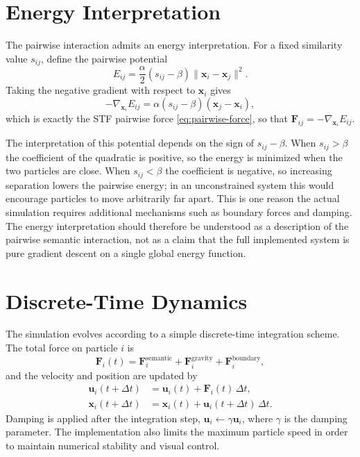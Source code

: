 \documentclass[11pt]{amsart}
\begin{document}
\section{Energy Interpretation}

The pairwise interaction admits an energy interpretation. For a fixed
similarity value $s_{ij}$, define the pairwise potential
\begin{equation}
\label{eq:pairwise-energy}
E_{ij}
=
\frac{\alpha}{2} \left( s_{ij} - \beta \right)
\|\mathbf{x}_i - \mathbf{x}_j\|^2.
\end{equation}
Taking the negative gradient with respect to $\mathbf{x}_i$ gives
\[
-\nabla_{\mathbf{x}_i} E_{ij}
=
\alpha \left( s_{ij} - \beta \right) (\mathbf{x}_j - \mathbf{x}_i),
\]
which is exactly the STF pairwise force \eqref{eq:pairwise-force}, so that
$\mathbf{F}_{ij} = -\nabla_{\mathbf{x}_i} E_{ij}$.

The interpretation of this potential depends on the sign of $s_{ij} - \beta$.
When $s_{ij} > \beta$ the coefficient of the quadratic is positive, so the
energy is minimized when the two particles are close. When $s_{ij} < \beta$ the
coefficient is negative, so increasing separation lowers the pairwise energy;
in an unconstrained system this would encourage particles to move arbitrarily
far apart. This is one reason the actual simulation requires additional
mechanisms such as boundary forces and damping. The energy interpretation
should therefore be understood as a description of the pairwise semantic
interaction, not as a claim that the full implemented system is pure gradient
descent on a single global energy function.

\section{Discrete-Time Dynamics}

The simulation evolves according to a simple discrete-time integration scheme.
The total force on particle $i$ is
\begin{equation}
\label{eq:total-force}
\mathbf{F}_i(t)
=
\mathbf{F}_i^{\mathrm{semantic}}
+ \mathbf{F}_i^{\mathrm{gravity}}
+ \mathbf{F}_i^{\mathrm{boundary}},
\end{equation}
and the velocity and position are updated by
\begin{align}
\mathbf{u}_i(t + \Delta t)
&=
\mathbf{u}_i(t) + \mathbf{F}_i(t)\,\Delta t, \label{eq:velocity-update} \\
\mathbf{x}_i(t + \Delta t)
&=
\mathbf{x}_i(t) + \mathbf{u}_i(t + \Delta t)\,\Delta t. \label{eq:position-update}
\end{align}
Damping is applied after the integration step, $\mathbf{u}_i \leftarrow
\gamma \mathbf{u}_i$, where $\gamma$ is the damping parameter. The
implementation also limits the maximum particle speed in order to maintain
numerical stability and visual control.
\end{document}
